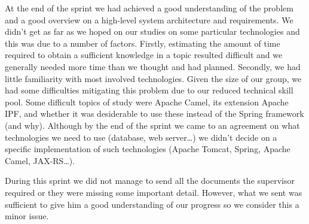 At the end of the sprint we had achieved a good understanding of the problem and a good overview on a
high-level system architecture and requirements. We didn't get as far as we hoped on our studies on some particular
technologies and this was due to a number of factors. Firstly, estimating the amount of time required to obtain
a sufficient knowledge in a topic resulted difficult and we generally needed more time than we thought and had planned.
Secondly, we had little familiarity with most involved technologies.
Given the size of our group, we had some difficulties mitigating this problem due to
our reduced technical skill pool. Some difficult topics of study were Apache Camel, its extension Apache IPF,
and whether it was desiderable to use these instead of the Spring framework (and why).
Although by the end of the sprint we came to an agreement on what technologies we need to use
(database, web server\ldots) we didn't decide on a specific implementation of such technologies
(Apache Tomcat, Spring, Apache Camel, JAX-RS\ldots).

During this sprint we did not manage to send all the documents the supervisor
required or they were missing some important detail. However, what we sent
was sufficient to give him a good understanding of our progress so we
consider this a minor issue.
